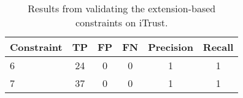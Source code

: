 \begin{table}[b]
\begin{center}
\begin{tabular}{lccccc}
\hline
\textbf{Constraint} & \textbf{TP} & \textbf{FP} & \textbf{FN} & \textbf{Precision} & \textbf{Recall} \\
\hline
6 & 24 & 0 & 0 & 1 & 1\\
\rowcolor{RowColor}
7 & 37 & 0 & 0 & 1 & 1\\
\hline
\end{tabular}
\end{center}
\caption{Results from validating the extension-based constraints on iTrust.}
\label{tab:tool_extension}
\end{table}